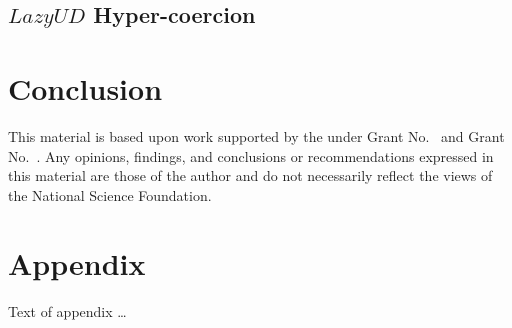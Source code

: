 \documentclass[acmsmall,review,anonymous]{acmart}\settopmatter{printfolios=true,printccs=false,printacmref=false}
\begin{document}
\subsection{$Lazy UD$ Hyper-coercion}

\section{Conclusion} \label{sec:conclude}

\begin{acks}                            %
  This material is based upon work supported by the
   under Grant
  No.~ and Grant
  No.~.  Any opinions, findings, and
  conclusions or recommendations expressed in this material are those
  of the author and do not necessarily reflect the views of the
  National Science Foundation.
\end{acks}





\appendix
\section{Appendix}

Text of appendix \ldots
\end{document}
